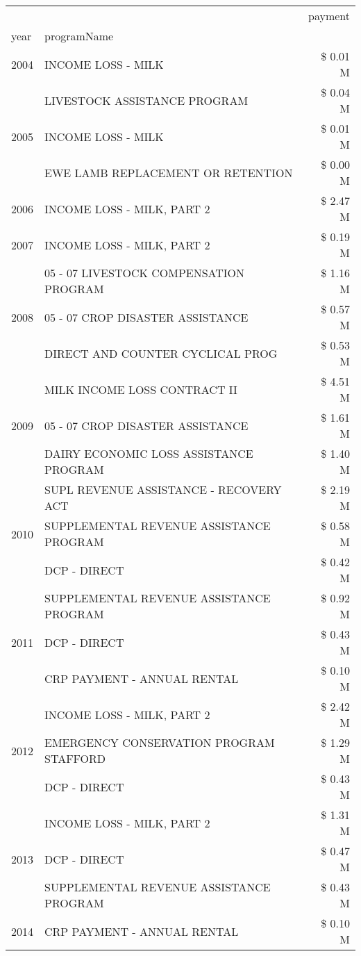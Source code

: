 \begin{tabular}{llr}
\toprule
 &  & payment \\
year & programName &  \\
\midrule
2004 & INCOME LOSS - MILK & \$ 0.01 M \\
\cline{1-3}
\multirow[t]{3}{*}{2005} & LIVESTOCK ASSISTANCE PROGRAM & \$ 0.04 M \\
 & INCOME LOSS - MILK & \$ 0.01 M \\
 & EWE LAMB REPLACEMENT OR RETENTION & \$ 0.00 M \\
\cline{1-3}
2006 & INCOME LOSS - MILK, PART 2 & \$ 2.47 M \\
\cline{1-3}
2007 & INCOME LOSS - MILK, PART 2 & \$ 0.19 M \\
\cline{1-3}
\multirow[t]{3}{*}{2008} & 05 - 07 LIVESTOCK COMPENSATION PROGRAM & \$ 1.16 M \\
 & 05 - 07 CROP DISASTER ASSISTANCE & \$ 0.57 M \\
 & DIRECT AND COUNTER CYCLICAL PROG & \$ 0.53 M \\
\cline{1-3}
\multirow[t]{3}{*}{2009} & MILK INCOME LOSS CONTRACT II & \$ 4.51 M \\
 & 05 - 07 CROP DISASTER ASSISTANCE & \$ 1.61 M \\
 & DAIRY ECONOMIC LOSS ASSISTANCE PROGRAM & \$ 1.40 M \\
\cline{1-3}
\multirow[t]{3}{*}{2010} & SUPL REVENUE ASSISTANCE - RECOVERY ACT & \$ 2.19 M \\
 & SUPPLEMENTAL REVENUE ASSISTANCE PROGRAM & \$ 0.58 M \\
 & DCP - DIRECT & \$ 0.42 M \\
\cline{1-3}
\multirow[t]{3}{*}{2011} & SUPPLEMENTAL REVENUE ASSISTANCE PROGRAM & \$ 0.92 M \\
 & DCP - DIRECT & \$ 0.43 M \\
 & CRP PAYMENT - ANNUAL RENTAL & \$ 0.10 M \\
\cline{1-3}
\multirow[t]{3}{*}{2012} & INCOME LOSS - MILK, PART 2 & \$ 2.42 M \\
 & EMERGENCY CONSERVATION PROGRAM STAFFORD & \$ 1.29 M \\
 & DCP - DIRECT & \$ 0.43 M \\
\cline{1-3}
\multirow[t]{3}{*}{2013} & INCOME LOSS - MILK, PART 2 & \$ 1.31 M \\
 & DCP - DIRECT & \$ 0.47 M \\
 & SUPPLEMENTAL REVENUE ASSISTANCE PROGRAM & \$ 0.43 M \\
\cline{1-3}
\multirow[t]{3}{*}{2014} & CRP PAYMENT - ANNUAL RENTAL & \$ 0.10 M \\

\end{tabular}
